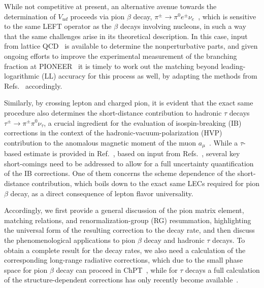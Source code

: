 \documentclass[prl,twocolumn,twoside,preprintnumbers,superscriptaddress,nofootinbib,letterpaper]{revtex4-1}
\begin{document}
While not competitive at present, an alternative avenue towards the determination of $V_{ud}$ proceeds via pion $\beta$ decay, $\pi^\pm\to\pi^0e^\pm\nu_e$~\cite{Pocanic:2003pf,Cirigliano:2002ng,Czarnecki:2019iwz}, which is sensitive to the same LEFT operator as the $\beta$ decays involving nucleons, in such a way that the same challenges arise in its theoretical description. In this case, input from lattice QCD~\cite{Feng:2020zdc,Ma:2021azh,Yoo:2023gln} is available to determine the nonperturbative parts, and given ongoing efforts to improve the experimental measurement of the branching fraction at PIONEER~\cite{PIONEER:2022yag,PIONEER:2025idw} it is timely to work out the matching beyond leading-logarithmic (LL) accuracy for this process as well, by adapting the methods from Refs.~\cite{Descotes-Genon:2005wrq,Cirigliano:2023fnz} accordingly.

Similarly, by crossing lepton and charged pion, it is evident that the exact same procedure also determines the short-distance contribution to hadronic $\tau$ decays $\tau^\pm\to\pi^\pm\pi^0\nu_\tau$, a crucial ingredient for the evaluation of isospin-breaking (IB) corrections in the context of the hadronic-vacuum-polarization (HVP) contribution to the anomalous magnetic moment of the muon $a_\mu$~\cite{Alemany:1997tn,Cirigliano:2001er,Cirigliano:2002pv,Flores-Baez:2006yiq,Davier:2010fmf,Miranda:2020wdg,Castro:2024prg,Aoyama:2020ynm,Aliberti:2025beg,Hertzog:2025ssc}. While a $\tau$-based estimate is provided in Ref.~\cite{Aliberti:2025beg}, based on input from Refs.~\cite{Davier:2023fpl,Davier:2010fmf,Castro:2024prg,Colangelo:2022prz,Hoferichter:2023sli}, several key short-comings need to be addressed to allow for a full uncertainty quantification of the  IB corrections. One of them concerns the scheme dependence of the short-distance contribution, which boils down to the exact same LECs required for pion $\beta$ decay, as a direct consequence of lepton flavor universality.

Accordingly, we first provide a general discussion of the pion matrix element, matching relations, and renormalization-group (RG) resummation, highlighting the universal form of the resulting correction to the decay rate, and then discuss the phenomenological applications to pion $\beta$ decay and hadronic $\tau$ decays. To obtain a complete result for the decay rates, we also need a calculation of the corresponding long-range radiative corrections, which due to the small phase space for pion $\beta$ decay can proceed in ChPT~\cite{Cirigliano:2002ng}, while for $\tau$ decays a full calculation of the structure-dependent corrections has only recently become available~\cite{Colangelo:2025iad,Colangelo:2025ivq}.
\end{document}
